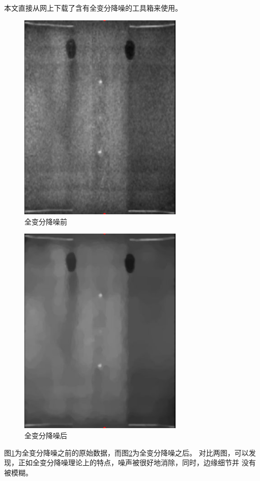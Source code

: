 本文直接从网上下载了含有全变分降噪的工具箱来使用。
\begin{figure}[!h]
\center
\includegraphics[width=0.7\textwidth]{figure/patternp/beforeTV.jpg}
\caption{全变分降噪前}
\label{fig:beforeTV}
\end{figure}
\begin{figure}[!h]
\center
\includegraphics[width=0.7\textwidth]{figure/patternp/afterTV.jpg}
\caption{全变分降噪后}
\label{fig:afterTV}
\end{figure}
图\ref{fig:beforeTV}为全变分降噪之前的原始数据，而图\ref{fig:afterTV}为全变分降噪之后。
对比两图，可以发现，正如全变分降噪理论上的特点，噪声被很好地消除，同时，边缘细节并
没有被模糊。


